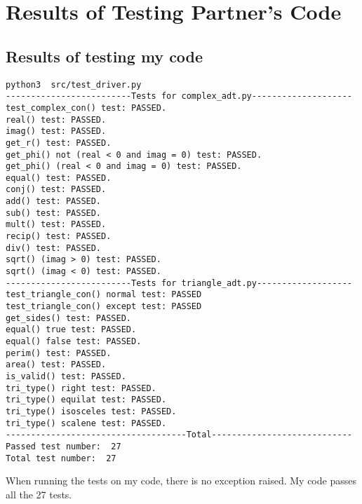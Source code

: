 \documentclass[12pt]{article}
\begin{document}
\section{Results of Testing Partner's Code}
\subsection{Results of testing my code}
\lstset{language=bash, basicstyle=\ttfamily\small, breaklines=true, showspaces=false,
  showstringspaces=false, breakatwhitespace=true}
\begin{lstlisting}
python3  src/test_driver.py
-------------------------Tests for complex_adt.py--------------------
test_complex_con() test: PASSED.
real() test: PASSED.
imag() test: PASSED.
get_r() test: PASSED.
get_phi() not (real < 0 and imag = 0) test: PASSED.
get_phi() (real < 0 and imag = 0) test: PASSED.
equal() test: PASSED.
conj() test: PASSED.
add() test: PASSED.
sub() test: PASSED.
mult() test: PASSED.
recip() test: PASSED.
div() test: PASSED.
sqrt() (imag > 0) test: PASSED.
sqrt() (imag < 0) test: PASSED.
-------------------------Tests for triangle_adt.py-------------------
test_triangle_con() normal test: PASSED
test_triangle_con() except test: PASSED
get_sides() test: PASSED.
equal() true test: PASSED.
equal() false test: PASSED.
perim() test: PASSED.
area() test: PASSED.
is_valid() test: PASSED.
tri_type() right test: PASSED.
tri_type() equilat test: PASSED.
tri_type() isosceles test: PASSED.
tri_type() scalene test: PASSED.
------------------------------------Total----------------------------
Passed test number:  27
Total test number:  27
\end{lstlisting}
When running the tests on my code, there is no exception raised. My code passes all the 27 tests.
\end{document}
